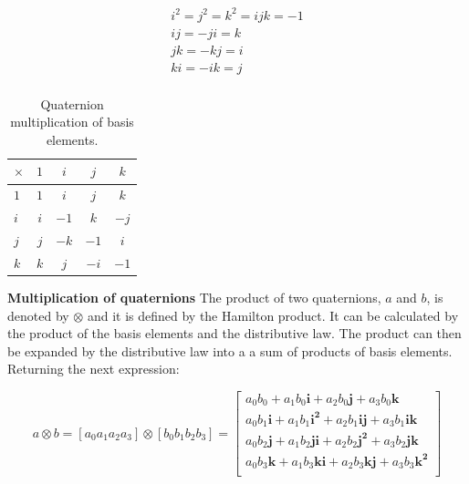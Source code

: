 \begin{equation}
    \begin{gathered}
        i^2=j^2=k^2=ijk=-1 \\
        ij = -ji = k       \\
        jk = -kj = i       \\
        ki = -ik = j       \\
    \end{gathered}
    \label{eq:quaternion_rules}
\end{equation}

\begin{table}[H]
    \begin{center}
        \begin{tabular}[t]{l|cccc}
            \hline
            $\times$ & $1$ & $i$  & $j$  & $k$  \\
            \hline
            $1$      & $1$ & $i$  & $j$  & $k$  \\
            $i$      & $i$ & $-1$ & $k$  & $-j$ \\
            $j$      & $j$ & $-k$ & $-1$ & $i$  \\
            $k$      & $k$ & $j$  & $-i$ & $-1$ \\
            \hline
        \end{tabular}
        \caption{Quaternion multiplication of basis elements. }
        \label{tab:quaternion_multiplication}
    \end{center}
\end{table}

\item \textbf{Multiplication of quaternions} The product of two quaternions, $a$ and $b$, is denoted by $\otimes$ and it is defined by the Hamilton product. It can be calculated by the product of the basis elements and the distributive law. The product can then be expanded by the distributive law into a a sum of products of basis elements. Returning the next expression:

\begin{equation}
    a \otimes b = \left[a_0 a_1 a_2 a_3\right] \otimes \left[b_0 b_1 b_2 b_3\right]     =
    \begin{bmatrix}
        a_0 b_0 + a_1 b_0\boldsymbol{i} + a_2 b_0\boldsymbol{j} + a_3 b_0\boldsymbol{k}                   \\
        a_0 b_1\boldsymbol{i} + a_1 b_1\boldsymbol{i^2} + a_2 b_1\boldsymbol{ij} + a_3 b_1\boldsymbol{ik} \\
        a_0 b_2\boldsymbol{j}+ a_1 b_2\boldsymbol{ji} + a_2 b_2\boldsymbol{j^2} + a_3 b_2\boldsymbol{jk}  \\
        a_0 b_3\boldsymbol{k} + a_1 b_3\boldsymbol{ki} + a_2 b_3\boldsymbol{kj} + a_3 b_3\boldsymbol{k^2} \\
    \end{bmatrix}
\end{equation}

